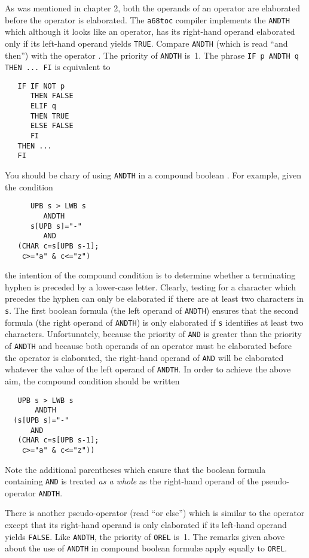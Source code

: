 As was mentioned in chapter 2, both the operands of an operator are
elaborated before the operator is elaborated. The \verb|a68toc| compiler
implements the  \verb|ANDTH| which although it
looks like an operator, has its right-hand operand elaborated only if
its left-hand operand yields \verb|TRUE|. Compare \verb|ANDTH| (which
is read ``and then'') with the operator .  The priority of
\verb|ANDTH| is~1. The phrase \verb|IF p ANDTH q THEN ... FI| is
equivalent to
\begin{verbatim}
   IF IF NOT p
      THEN FALSE
      ELIF q
      THEN TRUE
      ELSE FALSE
      FI
   THEN ...
   FI
\end{verbatim}

You should be chary of using \verb|ANDTH| in a compound boolean
. For example, given the condition
\begin{verbatim}
      UPB s > LWB s
         ANDTH
      s[UPB s]="-"
         AND
   (CHAR c=s[UPB s-1];
    c>="a" & c<="z")
\end{verbatim}
\noindent
the intention of the compound condition is to determine whether a
terminating hyphen is preceded by a lower-case letter.  Clearly,
testing for a character which precedes the hyphen can only be
elaborated if there are at least two characters in \verb|s|.  The
first boolean formula (the left operand of \verb|ANDTH|) ensures that
the second formula (the right operand of \verb|ANDTH|) is only
elaborated if \verb|s| identifies at least two characters.
Unfortunately, because the priority of \verb|AND| is greater than the
priority of \verb|ANDTH| and because both operands of an operator
must be elaborated before the operator is elaborated, the right-hand
operand of \verb|AND| will be elaborated whatever the value of the
left operand of \verb|ANDTH|.  In order to achieve the above aim, the
compound condition should be written
\begin{verbatim}
   UPB s > LWB s
       ANDTH
  (s[UPB s]="-"
      AND
   (CHAR c=s[UPB s-1];
    c>="a" & c<="z"))
\end{verbatim}
\noindent
Note the additional parentheses which ensure that the boolean formula
containing \verb|AND| is treated {\it as a whole\/} as the right-hand
operand of the pseudo-operator \verb|ANDTH|.

There is another pseudo-operator  (read ``or else'') which
is similar to the operator  except that its right-hand
operand is only elaborated if its left-hand operand yields
\verb|FALSE|.  Like \verb|ANDTH|, the priority of \verb|OREL| is~1.
The remarks given above about the use of \verb|ANDTH| in compound
boolean formul{\ae} apply equally to \verb|OREL|.

